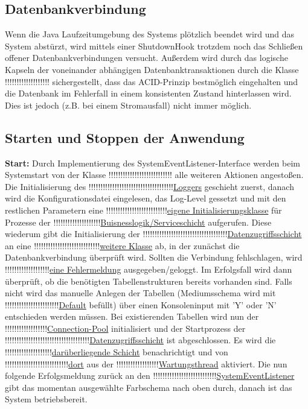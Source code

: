\documentclass{article}
\begin{document}
\subsection{Datenbankverbindung}
Wenn die Java Laufzeitumgebung des Systems plötzlich beendet wird und das System abstürzt, wird mittels einer ShutdownHook trotzdem noch das Schließen offener Datenbankverbindungen versucht. Außerdem wird durch das logische Kapseln der voneinander abhängigen Datenbanktransaktionen durch die Klasse !!!!!!!!!!!!!!!!!!!\hyperlink{}{} sichergestellt, dass das ACID-Prinzip bestmöglich eingehalten und die Datenbank im Fehlerfall in einem konsistenten Zustand hinterlassen wird. Dies ist jedoch (z.B. bei einem Stromausfall) nicht immer möglich.
\subsection{Starten und Stoppen der Anwendung}
\noindent \textbf{Start:} Durch Implementierung des SystemEventListener-Interface werden beim Systemstart von der Klasse !!!!!!!!!!!!!!!!!!!!!!!!!!!\hyperlink{}{} alle weiteren Aktionen angestoßen. Die Initialisierung des !!!!!!!!!!!!!!!!!!!!!!!!!!!!!!!!!!!!\hyperlink{}{Loggers} geschieht zuerst, danach wird die Konfigurationsdatei eingelesen, das Log-Level gessetzt und mit den restlichen Parametern eine !!!!!!!!!!!!!!!!!!!!!!!!!!\hyperlink{}{eigene Initialisierungsklasse} für Prozesse der !!!!!!!!!!!!!!!!!!!!\hyperlink{}{Buisnesslogik/Serviceschicht} aufgerufen. Diese wiederum gibt die Initialisierung der !!!!!!!!!!!!!!!!!!!!!!!!!!!!!!!!!!!!\hyperlink{}{Datenzugriffsschicht} an eine !!!!!!!!!!!!!!!!!!!!!!!!!!!!\hyperlink{}{weitere Klasse} ab, in der zunächst die Datenbankverbindung überprüft wird. Sollten die Verbindung fehlschlagen, wird !!!!!!!!!!!!!!!!!!!\hyperlink{}{eine Fehlermeldung} ausgegeben/geloggt. Im Erfolgsfall wird dann überprüft, ob die benötigten Tabellenstrukturen bereits vorhanden sind. Falls nicht wird das manuelle Anlegen der Tabellen (Mediumsschema wird mit !!!!!!!!!!!!!!!!!!!!!!!\hyperlink{}{Default} befüllt) über einen Konsoleninput mit 'Y' oder 'N' entschieden werden müssen. Bei existierenden Tabellen wird  nun der !!!!!!!!!!!!!!!!!!\hyperlink{}{Connection-Pool} initialisiert und der Startprozess der !!!!!!!!!!!!!!!!!!!!!!!!!!!!!!!!!!!!\hyperlink{}{Datenzugriffsschicht} ist abgeschlossen. Es wird die  !!!!!!!!!!!!!!!!!!!!\hyperlink{}{darüberliegende Schicht} benachrichtigt und von !!!!!!!!!!!!!!!!!!!!!!!!!!!\hyperlink{}{dort} aus der !!!!!!!!!!!!!!!!!!\hyperlink{}{Wartungsthread} aktiviert. Die nun folgende Erfolgsmeldung zurück an den !!!!!!!!!!!!!!!!!!!!!!!!!!!\hyperlink{}{SystemEventListener} gibt das momentan ausgewählte Farbschema nach oben durch, danach ist das System betriebsbereit. \\
\end{document}
